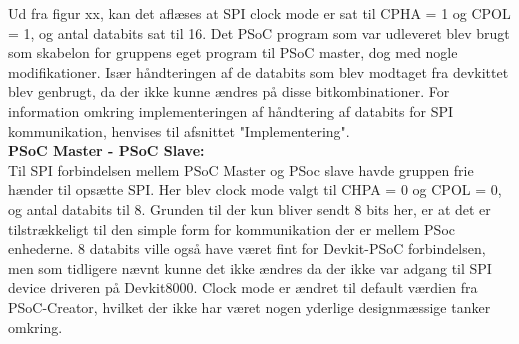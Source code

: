 Ud fra figur xx, kan det aflæses at SPI clock mode er sat til CPHA = 1 og CPOL = 1, og antal databits sat til 16. Det PSoC program som var udleveret blev brugt
som skabelon for gruppens eget program til PSoC master, dog med nogle modifikationer. Især håndteringen af de databits som blev modtaget fra devkittet blev 
genbrugt, da der ikke kunne ændres på disse bitkombinationer. For information omkring implementeringen af håndtering af databits for SPI kommunikation, 
henvises til afsnittet "Implementering". \\

\textbf{PSoC Master - PSoC Slave:} \\

Til SPI forbindelsen mellem PSoC Master og PSoc slave havde gruppen frie hænder til opsætte SPI. Her blev clock mode valgt til CHPA = 0 og CPOL = 0, og 
antal databits til 8. Grunden til der kun bliver sendt 8 bits her, er at det er tilstrækkeligt til den simple form for kommunikation der er mellem PSoc enhederne.
8 databits ville også have været fint for Devkit-PSoC forbindelsen, men som tidligere nævnt kunne det ikke ændres da der ikke var adgang til SPI device driveren
på Devkit8000. Clock mode er ændret til default værdien fra PSoC-Creator, hvilket der ikke har været nogen yderlige designmæssige tanker omkring. 

